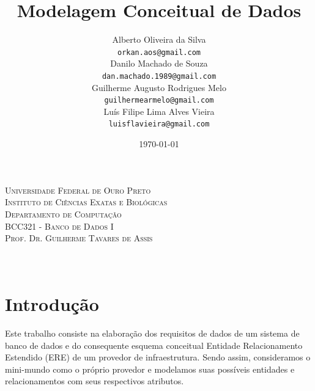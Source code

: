 \documentclass[a4paper]{article}
\title{Modelagem Conceitual de Dados} \let\Title\@title
\author{Alberto Oliveira da Silva\\ \texttt{orkan.aos@gmail.com} \\ \vspace{2.5mm}
Danilo Machado de Souza \\ \texttt{dan.machado.1989@gmail.com} \\ \vspace{2.5mm}
Guilherme Augusto Rodrigues Melo \\ \texttt{guilhermearmelo@gmail.com} \\ \vspace{2.5mm}
Luís Filipe Lima Alves Vieira \\ \texttt{luisflavieira@gmail.com}} \let\Author\@author
\date{\today} \let\Date\@date
\begin{document}
\begin{large}
\begin{titlepage}
  \begin{center}
    \textsc{
    \LARGE
    Universidade Federal de Ouro Preto\\
    \Large
    Instituto de Ciências Exatas e Biológicas \\
    Departamento de Computação \\
    BCC321 - Banco de Dados I \\
    Prof. Dr. Guilherme Tavares de Assis\\}
    \vspace*{5cm}
    \LARGE{\Title} \\
    \vspace*{4cm}
    \Large{\Author} \\
    \vspace{\fill}
    \textbf{\Date}
  \end{center}
\end{titlepage}

\tableofcontents
\clearpage

\section{Introdução}
\quad Este trabalho consiste na elaboração dos requisitos de dados de um sistema de banco de dados e do consequente esquema conceitual Entidade Relacionamento Estendido (ERE) de um provedor de infraestrutura. Sendo assim, consideramos o mini-mundo como o próprio provedor e modelamos suas possíveis entidades e relacionamentos com seus respectivos atributos.



\end{large}
\end{document}
